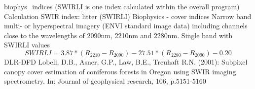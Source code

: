 %
{ %
biophys\_indices (SWIRLI is one index calculated within the overall program)
}
%
{ %
Calculation SWIR index: litter (SWIRLI)
}
%
{ %
Biophysics - cover indices
}
%
{ %
Narrow band multi- or hyperspectral imagery (ENVI standard image data) including channels close to the wavelengths of 2090nm, 2210nm and 2280nm.\bigskip
}
%
{ %
Single band with SWIRLI values
}
%
{ %
\begin{displaymath}
SWIRLI= 3.87 * (R_{2210}-R_{2090}) -27.51 * (R_{2280} - R_{2090}) -0.20
\end{displaymath}
}
%
{ %
DLR-DFD
}
%
{ %
Lobell, D.B., Asner, G.P., Law, B.E., Treuhaft R.N. (2001): Subpixel canopy cover estimation of coniferous forests in Oregon using SWIR imaging spectrometry. In: Journal of geophysical research, 106, p.5151-5160
}
